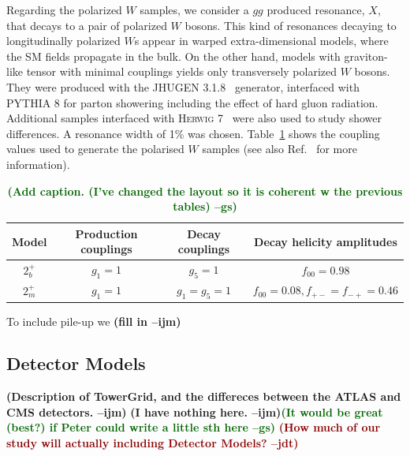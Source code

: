 \documentclass[11pt,letterpaper]{article}
\DeclareRobustCommand{\Ref}[1]{Ref.~\cite{#1}}
\newcommand{\jdt}[1]{\textbf{\textcolor{darkred}{(#1 --jdt)}}}
\newcommand{\ijm}[1]{\textbf{\textcolor{llblue}{(#1 --ijm)}}}
\newcommand{\gs}[1]{\textbf{\textcolor{darkgreen}{(#1 --gs)}}}
\begin{document}
Regarding the polarized $W$ samples, we consider a $gg$ produced resonance, $X$, that decays to a pair of polarized $W$ bosons.
%
This kind of resonances decaying to longitudinally polarized $W$s appear in warped extra-dimensional models, where the SM fields propagate in the bulk.
%
On the other hand, models with graviton-like tensor with minimal couplings yields only transversely polarized $W$ bosons.
%
They were produced with the \textsc{JHUGEN} 3.1.8~\cite{Gao:2010qx,Bolognesi:2012mm} generator, interfaced with \textsc{PYTHIA} 8 \cite{Sjostrand:2007gs} for parton showering including the effect of hard gluon radiation.
%
Additional samples interfaced with \textsc{Herwig} 7~\cite{Bahr:2008pv,Bellm:2015jjp} were also used to study shower differences.
%
A resonance width of 1\% was chosen.
%
Table~\ref{table:polarisedSamples} shows the coupling values used to generate the polarised $W$ samples (see also \Ref{Gao:2010qx} for more information). 

\begin{table}[ht]
\centering
\begin{tabular}{|c|c|c|c|}
\hline
Model	&Production couplings	&Decay couplings	&Decay helicity amplitudes 	\\
\hline
$2_b^+$	& $g_1=1$		& $g_5=1$		& $f_{00}=0.98$			\\
$2_m^+$	& $g_1=1$		& $g_1=g_5=1$		& $f_{00}=0.08,f_{+-}=f_{-+}=0.46$\\	
\hline
\end{tabular}
\caption{\gs{Add caption. (I've changed the layout so it is coherent w
  the previous tables)}}
\label{table:polarisedSamples}
\end{table}

To include pile-up we \ijm{fill in}


\subsection{Detector Models}\label{sec:det_model}

\ijm{Description of TowerGrid, and the differeces between the ATLAS and CMS detectors. }
\ijm{I have nothing here.}\gs{It would be great (best?) if Peter could
  write a little sth here} \jdt{How much of our study will actually including Detector Models?}
\end{document}
